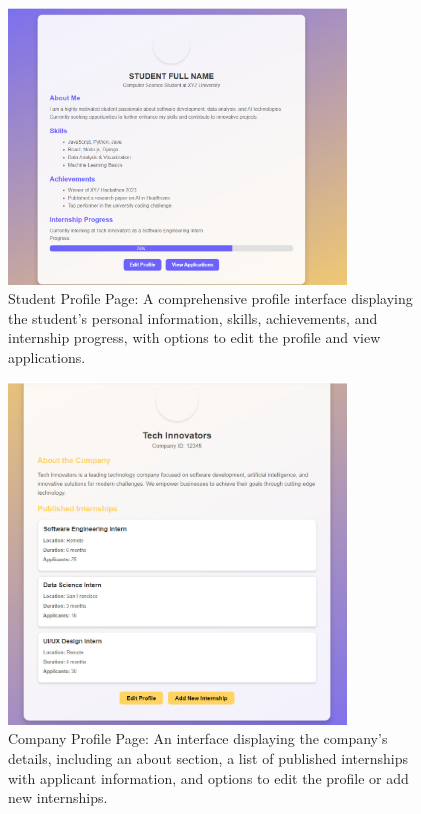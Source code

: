 \begin{figure}[H]
\centering
\includegraphics[width=0.8\textwidth]{Images/11.jpg}
\caption{\label{fig:metamodel11}Student Profile Page: A comprehensive profile interface displaying the student's personal information, skills, achievements, and internship progress, with options to edit the profile and view applications.}
\end{figure}

\begin{figure}[H]
\centering
\includegraphics[width=0.8\textwidth]{Images/12.jpg}
\caption{\label{fig:metamodel12}Company Profile Page: An interface displaying the company's details, including an about section, a list of published internships with applicant information, and options to edit the profile or add new internships.}
\end{figure}

